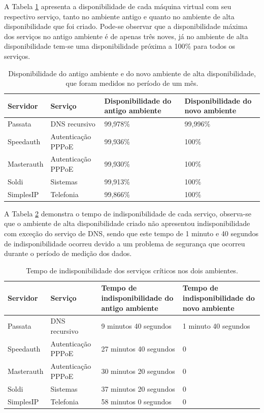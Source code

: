 A Tabela \ref{tab:testefinal} apresenta a disponibilidade de cada máquina virtual com seu respectivo serviço, tanto no ambiente antigo e quanto 
no ambiente de alta disponibilidade que foi criado. Pode-se observar que a disponibilidade máxima dos serviços no antigo ambiente é de apenas 
três noves, já no ambiente de alta disponibilidade tem-se uma disponibilidade próxima a 100\% para todos os serviços.

\begin{table}[h!]
\caption{Disponibilidade do antigo ambiente e do novo ambiente de alta disponibilidade, que foram medidos no período de um mês.}
\small
\label{tab:testefinal}
\begin{center}
\begin{tabular}{|l|l|p{4cm}|p{4cm}|}\hline
\textbf{Servidor} & \textbf{Serviço} & \textbf{Disponibilidade do antigo ambiente} & \textbf{Disponibilidade do novo ambiente} \\\hline
Passata & DNS recursivo & 99,978\% & 99,996\% \\\hline
Speedauth & Autenticação \ac{PPPoE} & 99,936\% & 100\% \\\hline
Masterauth & Autenticação \ac{PPPoE} & 99,930\% & 100\% \\\hline
Soldi & Sistemas & 99,913\% & 100\% \\\hline
SimplesIP & Telefonia & 99,866\% & 100\% \\\hline
\end{tabular}
\end{center}
\end{table}

A Tabela \ref{tab:testefinal2} demonstra o tempo de indisponibilidade de cada serviço, observa-se que o ambiente de alta disponibilidade
criado não apresentou indisponibilidade com exceção do serviço de \ac{DNS}, sendo que este tempo de 1 minuto e 40 segundos de indisponibilidade 
ocorreu devido a um problema de segurança que ocorreu durante o período de medição dos dados.

\begin{table}[h!]
\caption{Tempo de indisponibilidade dos serviços críticos nos dois ambientes.}
\small
\label{tab:testefinal2}
\begin{center}
\begin{tabular}{|l|l|p{4cm}|p{4cm}|}\hline
\textbf{Servidor} & \textbf{Serviço} & \textbf{Tempo de indisponibilidade do antigo ambiente} & \textbf{Tempo de indisponibilidade do novo ambiente} \\\hline
Passata & DNS recursivo & 9 minutos 40 segundos & 1 minuto 40 segundos \\\hline
Speedauth & Autenticação \ac{PPPoE} & 27 minutos 40 segundos & 0 \\\hline
Masterauth & Autenticação \ac{PPPoE} & 30 minutos 20 segundos & 0 \\\hline
Soldi & Sistemas & 37 minutos 20 segundos & 0 \\\hline
SimplesIP & Telefonia & 58 minutos 0 segundos & 0 \\\hline
\end{tabular}
\end{center}
\end{table}


